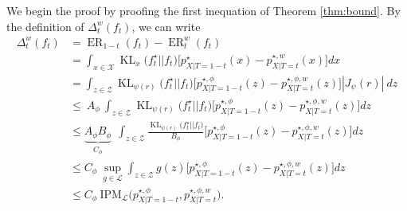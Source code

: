 \documentclass[12pt]{article}
\theoremstyle{plain}
\theoremstyle{definition}
\theoremstyle{remark}
\DeclareMathOperator{\KL}{\text{KL}}
\DeclareMathOperator{\ER}{\text{ER}}
\begin{document}
We begin the proof by proofing the first inequation of Theorem \ref{thm:bound}. By the definition of $\Delta _{t}^w( f_t)$, we can write
\begin{align*} 
\Delta _{t}^w( f_t) & =  \ER_{1-t}( f_t) -\ER^{w}_{t}( f_t)\\
&= \int _{x\in \mathcal{X}} \KL_{x}\Big( f^{\star}_t ||f_t\Big)\Big[p^\star_{X | T=1-t}(x) -p^{\star,w}_{X | T=t}( x)\Big] dx\\
 & =\int _{z\in \mathcal{Z}} \KL_{\psi ( r)}\Big( f^{\star}_t ||f_t\Big)\Big[ p^{\star,\phi}_{X | T=1-t}(z) - p^{\star,\phi,w}_{X | T=t}(z)\Big] |J_{\psi }( r) |\ dz\\
 & \leq \ A_{\phi } \ \int _{z\in \mathcal{Z}} \KL_{\psi ( r)}\Big( f^{\star}_t ||f_t\Big)\Big[ p^{\star,\phi}_{X | T=1-t}(z) - p^{\star,\phi,w}_{X | T=t}(z)\Big]dz\\
 &\leq \underbrace{ A_{\phi } B_{\phi }}_{C_\phi} \ \ \int _{z\in \mathcal{Z}}\frac{\KL_{\psi ( r)}\Big( f^{\star}_t ||f_t\Big)}{B_{\phi}}\Big[ p^{\star,\phi}_{X | T=1-t}(z) - p^{\star,\phi,w}_{X | T=t}(z)\Big] dz\\
 & \leq C_{\phi } \ \sup _{g \in \mathcal{L}}\int _{z\in \mathcal{Z}} g(z) \Big[ p^{\star,\phi}_{X | T=1-t}(z) - p^{\star,\phi,w}_{X | T=t}(z)\Big] dz\\
 & \leq C_{\phi } \ \text{IPM}_{\mathcal{L}}\Big( p^{\star,\phi}_{X | T=1-t} ,p^{\star,\phi,w}_{X | T=t}\Big).
\end{align*}
\end{document}
